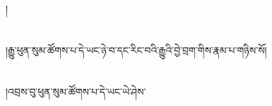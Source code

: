 །\chapter{ }།རྒྱུ་ཕུན་སུམ་ཚོགས་པ་དེ་ཡང་ཉེ་བ་དང་རིང་བའི་རྒྱུའི་བྱེ་བྲག་གིས་རྣམ་པ་གཉིས་སོ།\chapter{ }།འབྲས་བུ་ཕུན་སུམ་ཚོགས་པ་དེ་ཡང་ཡེ་ཤེས་